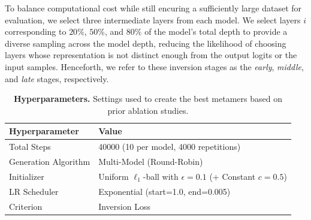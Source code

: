 \documentclass[pdflatex,sn-mathphys-num]{sn-jnl}%
\theoremstyle{thmstyleone}%
\theoremstyle{thmstyletwo}%
\theoremstyle{thmstylethree}%
\begin{document}
To balance computational cost while still encuring a sufficiently large dataset for evaluation, we select three intermediate layers from each model. We select layers $i$ corresponding to $20\%$, $50\%$, and $80\%$ of the model's total depth to provide a diverse sampling across the model depth, reducing the likelihood of choosing layers whose representation is not distinct enough from the output logits or the input samples.
Henceforth, we refer to these inversion stages as the \emph{early}, \emph{middle}, and \emph{late} stages, respectively.


\begin{table}
    \centering
    \begin{tabular}{|l|l|}
        \hline
        \textbf{Hyperparameter} & \textbf{Value} \\
        \hline
        Total Steps & 40000 (10 per model, 4000 repetitions) \\
        \hline
        Generation Algorithm & Multi-Model (Round-Robin) \\
        \hline
        Initializer & Uniform $\ell_1$-ball with $\epsilon = 0.1$ (+ Constant $c = 0.5$) \\
        \hline
        LR Scheduler & Exponential (start=1.0, end=0.005) \\
        \hline
        Criterion & Inversion Loss \cite{gomez_exploiting_2020} \\
        \hline
    \end{tabular}
    \caption{\textbf{Hyperparameters.} Settings used to create the best metamers based on prior ablation studies.}
    \label{tab:best-settings}
\end{table}
\end{document}
